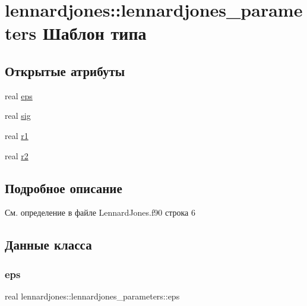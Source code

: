\hypertarget{structlennardjones_1_1lennardjones__parameters}{}\section{lennardjones\+:\+:lennardjones\+\_\+parameters Шаблон типа}
\label{structlennardjones_1_1lennardjones__parameters}
\subsection*{Открытые атрибуты}
\begin{DoxyCompactItemize}
\item 
real \mbox{\hyperlink{structlennardjones_1_1lennardjones__parameters_acf8f72dcb55c79e0c26e811d835f9f0f}{eps}}
\item 
real \mbox{\hyperlink{structlennardjones_1_1lennardjones__parameters_a006bd17e43dab4f8df5d45086b838bc8}{sig}}
\item 
real \mbox{\hyperlink{structlennardjones_1_1lennardjones__parameters_a1950c8901fc88cb41fa23dc1edd040a8}{r1}}
\item 
real \mbox{\hyperlink{structlennardjones_1_1lennardjones__parameters_abc2498c7e76afc7a60d66ce09d4acdea}{r2}}
\end{DoxyCompactItemize}


\subsection{Подробное описание}


См. определение в файле Lennard\+Jones.\+f90 строка 6



\subsection{Данные класса}
\mbox{\label{structlennardjones_1_1lennardjones__parameters_acf8f72dcb55c79e0c26e811d835f9f0f}} 
\subsubsection{\texorpdfstring{eps}{eps}}
{\footnotesize\ttfamily real lennardjones\+::lennardjones\+\_\+parameters\+::eps}



